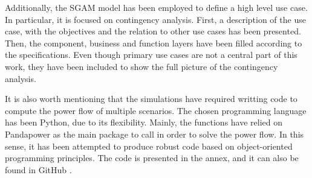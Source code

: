 Additionally, the SGAM model has been employed to define a high level use case. In particular, it is focused on contingency analysis. First, a description of the use case, with the objectives and the relation to other use cases has been presented. Then, the component, business and function layers have been filled according to the specifications. Even though primary use cases are not a central part of this work, they have been included to show the full picture of the contingency analysis.

It is also worth mentioning that the simulations have required writting code to compute the power flow of multiple scenarios. The chosen programming language has been Python, due to its flexibility. Mainly, the functions have relied on Pandapower as the main package to call in order to solve the power flow. In this sense, it has been attempted to produce robust code based on object-oriented programming principles. The code is presented in the annex, and it can also be found in GitHub \cite{repoo}. 
